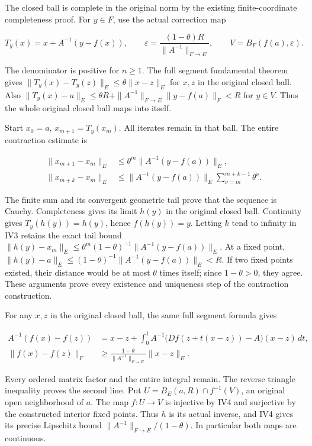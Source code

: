 \documentclass[
  11pt,
]{article}
\begin{document}
The closed ball is complete in the original norm by the existing
finite-coordinate completeness proof. For \(y\in F\), use the actual
correction map

\[
 T_y(x)=x+A^{-1}(y-f(x)),\qquad
 \varepsilon=\frac{(1-\theta)R}{\|A^{-1}\|_{F\to E}},\qquad
 V=B_F(f(a),\varepsilon).
 \tag{IV2}
\]

The denominator is positive for \(n\geq1\). The full segment fundamental
theorem gives \(\|T_y(x)-T_y(z)\|_E\leq\theta\|x-z\|_E\) for \(x,z\) in
the original closed ball. Also
\(\|T_y(x)-a\|_E\leq\theta R+\|A^{-1}\|_{F\to E}\|y-f(a)\|_F<R\) for
\(y\in V\). Thus the whole original closed ball maps into itself.

Start \(x_0=a\), \(x_{m+1}=T_y(x_m)\). All iterates remain in that ball.
The entire contraction estimate is

\[
 \begin{aligned}
 \|x_{m+1}-x_m\|_E
   &\leq\theta^m\|A^{-1}(y-f(a))\|_E,\\
 \|x_{m+k}-x_m\|_E
   &\leq\|A^{-1}(y-f(a))\|_E
                         \sum_{\nu=m}^{m+k-1}\theta^\nu .
 \end{aligned}
 \tag{IV3}
\]

The finite sum and its convergent geometric tail prove that the sequence
is Cauchy. Completeness gives its limit \(h(y)\) in the original closed
ball. Continuity gives \(T_y(h(y))=h(y)\), hence \(f(h(y))=y\). Letting
\(k\) tend to infinity in IV3 retains the exact tail bound
\(\|h(y)-x_m\|_E\leq\theta^m(1-\theta)^{-1}\|A^{-1}(y-f(a))\|_E\). At a
fixed point, \(\|h(y)-a\|_E\leq(1-\theta)^{-1}\|A^{-1}(y-f(a))\|_E<R\).
If two fixed points existed, their distance would be at most \(\theta\)
times itself; since \(1-\theta>0\), they agree. These arguments prove
every existence and uniqueness step of the contraction construction.

For any \(x,z\) in the original closed ball, the same full segment
formula gives

\[
 \begin{aligned}
 A^{-1}(f(x)-f(z))
 &=x-z+\int_0^1
      A^{-1}\bigl(Df(z+t(x-z))-A\bigr)(x-z)\,dt,\\
 \|f(x)-f(z)\|_F
 &\geq\frac{1-\theta}{\|A^{-1}\|_{F\to E}}\|x-z\|_E .
 \end{aligned}
 \tag{IV4}
\]

Every ordered matrix factor and the entire integral remain. The reverse
triangle inequality proves the second line. Put
\(U=B_E(a,R)\cap f^{-1}(V)\), an original open neighborhood of \(a\).
The map \(f:U\to V\) is injective by IV4 and surjective by the
constructed interior fixed points. Thus \(h\) is its actual inverse, and
IV4 gives its precise Lipschitz bound
\(\|A^{-1}\|_{F\to E}/(1-\theta)\). In particular both maps are
continuous.
\end{document}
